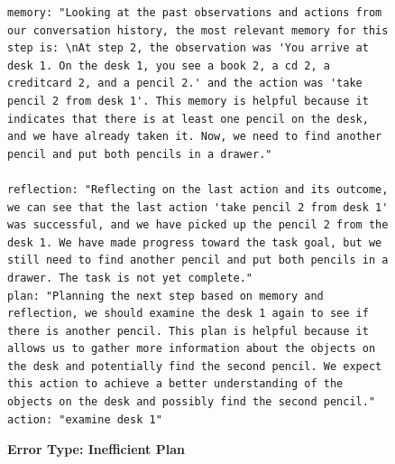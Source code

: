 \documentclass[../../main.tex]{subfiles}
\begin{document}
\begin{figure}[htbp]
\begin{tcolorbox}[
    title=\textbf{Error Type - Inefficient Plan},
    colback=orange!1!white,
    colframe=orange!50!black,
    fonttitle=\bfseries,
    enhanced jigsaw,
    breakable
]
\begin{Verbatim}[breaklines=true, breakanywhere=true]
memory: "Looking at the past observations and actions from our conversation history, the most relevant memory for this step is: \nAt step 2, the observation was 'You arrive at desk 1. On the desk 1, you see a book 2, a cd 2, a creditcard 2, and a pencil 2.' and the action was 'take pencil 2 from desk 1'. This memory is helpful because it indicates that there is at least one pencil on the desk, and we have already taken it. Now, we need to find another pencil and put both pencils in a drawer."

reflection: "Reflecting on the last action and its outcome, we can see that the last action 'take pencil 2 from desk 1' was successful, and we have picked up the pencil 2 from the desk 1. We have made progress toward the task goal, but we still need to find another pencil and put both pencils in a drawer. The task is not yet complete."
plan: "Planning the next step based on memory and reflection, we should examine the desk 1 again to see if there is another pencil. This plan is helpful because it allows us to gather more information about the objects on the desk and potentially find the second pencil. We expect this action to achieve a better understanding of the objects on the desk and possibly find the second pencil."
action: "examine desk 1"
\end{Verbatim}


\end{tcolorbox}
\vspace{-1em}
\caption{\textbf{Error Type: Inefficient Plan}}
\label{fig:error_inefficient_plan}
\end{figure}
\end{document}
